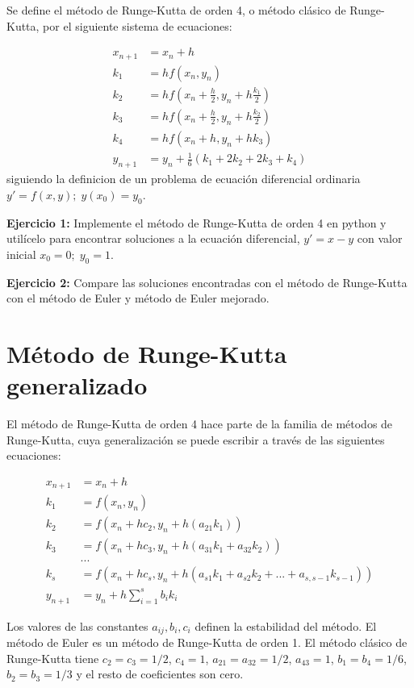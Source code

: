 \documentclass[10.5pt]{article}
\begin{document}
Se define el método de Runge-Kutta de orden 4, o método clásico de Runge-Kutta, por el siguiente sistema de ecuaciones:

\begin{align}
  x_{n+1} & =  x_{n}+h \\
  k_{1} & =  hf(x_{n},y_{n}) \\
  k_{2} & =  hf(x_{n}+\frac{h}{2},y_{n}+h\frac{k_{1}}{2}) \\
  k_{3} & =  hf(x_{n}+\frac{h}{2},y_{n}+h\frac{k_{2}}{2}) \\
  k_{4} & =  hf(x_{n}+h,y_{n}+hk_{3}) \\
  y_{n+1} & =  y_{n} + \frac{1}{6}(k_{1}+2k_{2}+2k_{3}+k_{4})
\end{align}siguiendo la definicion de un problema de ecuación diferencial ordinaria $y'=f(x,y);\; y(x_{0})=y_{0}$.

{\bf Ejercicio 1:} Implemente el método de Runge-Kutta de orden 4 en python y utilícelo para encontrar soluciones a la ecuación diferencial, $y'=x-y$ con valor inicial $x_{0}=0;\; y_{0}=1$.

{\bf Ejercicio 2:} Compare las soluciones encontradas con el método de Runge-Kutta con el método de Euler y método de Euler mejorado.

\section{Método de Runge-Kutta generalizado}

El método de Runge-Kutta de orden 4 hace parte de la familia de métodos de Runge-Kutta, cuya generalización se puede escribir a través de las siguientes ecuaciones:

\begin{align}
  x_{n+1} & =  x_{n}+h \\
  k_{1} & =  f(x_{n},y_{n}) \\
  k_{2} & =  f(x_{n}+hc_{2},y_{n}+h(a_{21}k_{1})) \\
  k_{3} & =  f(x_{n}+hc_{3},y_{n}+h(a_{31}k_{1}+a_{32}k_{2})) \\
  & ... \\
  k_{s} & =  f(x_{n}+hc_{s},y_{n}+h(a_{s1}k_{1}+a_{s2}k_{2}+...+a_{s,s-1}k_{s-1})) \\
  y_{n+1} & =  y_{n} + h\sum_{i=1}^{s}b_{i}k_{i}
\end{align}

Los valores de las constantes $a_{ij},b_{i},c_{i}$ definen la estabilidad del método. El método de Euler es un método de Runge-Kutta de orden 1. El método clásico de Runge-Kutta tiene $c_{2}=c_{3}=1/2$, $c_{4}=1$, $a_{21}=a_{32}=1/2$, $a_{43}=1$, $b_{1}=b_{4}=1/6$, $b_{2}=b_{3}=1/3$ y el resto de coeficientes son cero.
\end{document}
